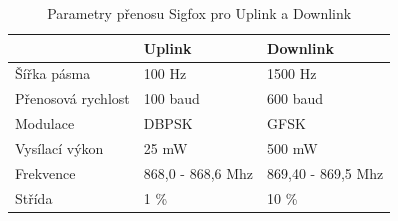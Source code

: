 \documentclass{ctuthesis}
\begin{document}
\begin{table}[]
\begin{tabular}{@{}ll|l@{}}
\toprule
                   & Uplink            & Downlink           \\ \midrule
Šířka pásma        & 100 Hz            & 1500 Hz            \\
Přenosová rychlost & 100 baud          & 600 baud           \\
Modulace           & DBPSK             & GFSK               \\
Vysílací výkon     & 25 mW             & 500 mW             \\
Frekvence          & 868,0 - 868,6 Mhz & 869,40 - 869,5 Mhz \\
Střída             & 1 \%              & 10 \%             
\end{tabular}
\caption{Parametry přenosu Sigfox pro Uplink a Downlink}
\label{tab:upAndDown}
\cite{https://www.ietf.org/proceedings/96/slides/slides-96-lpwan-10.pdf}
\end{table}
\end{document}

